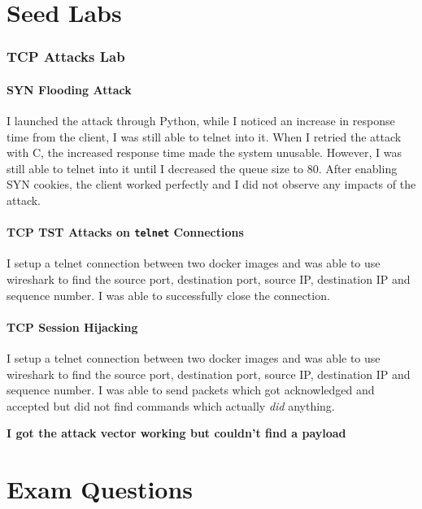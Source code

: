 \documentclass[10pt,\jkfside,a4paper]{article}
\begin{document}
\part{Seed Labs}

\section{TCP Attacks Lab}

\subsection{SYN Flooding Attack}

I launched the attack through Python, while I noticed an increase in
response time from the client, I was still able to telnet into it. When I
retried the attack with C, the increased response time made the system
unusable. However, I was still able to telnet into it until I decreased the
queue size to 80. After enabling SYN cookies, the client worked perfectly
and I did not observe any impacts of the attack.

\subsection{TCP TST Attacks on \texttt{telnet} Connections}

I setup a telnet connection between two docker images and was able to use 
wireshark to find the source port, destination port, source IP, destination 
IP and sequence number. I was able to successfully close the connection. 

\subsection{TCP Session Hijacking}

I setup a telnet connection between two docker images and was able to use
wireshark to find the source port, destination port, source IP, destination
IP and sequence number. I was able to send packets which got acknowledged
and accepted but did not find commands which actually \textit{did} anything.

\textbf{I got the attack vector working but couldn't find a payload}

\part{Exam Questions}
\end{document}
